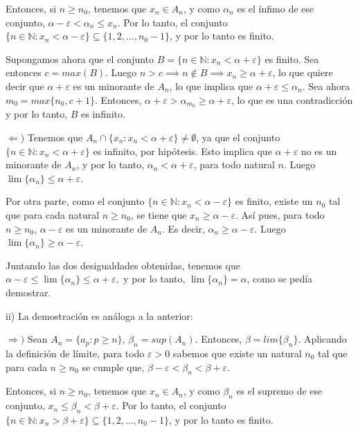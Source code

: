 \documentclass[10pt,a4paper]{article}
\begin{document}
	Entonces, si $n \geq n_0$, tenemos que $x_n \in A_n$, y como $\alpha_n$ es el ínfimo de ese conjunto, $ \alpha - \varepsilon < \alpha_n \leq x_n$. Por lo tanto, el conjunto $\{n \in \mathbb{N}: x_n < \alpha - \varepsilon\} \subseteq \{1, 2, \ldots, n_0 - 1\}$, y por lo tanto es finito. 
	
	
	Supongamos ahora que el conjunto $B = \{n \in \mathbb{N}: x_n < \alpha + \varepsilon\}$ es finito. Sea entonces $c = max(B)$. Luego $n > c \implies n \notin B \implies x_n \geq \alpha + \varepsilon$, lo que quiere decir que $\alpha + \varepsilon$ es un minorante de $A_n$, lo que implica que $\alpha + \varepsilon \leq \alpha_n$. Sea ahora $m_0 = max\{n_0, c + 1\}$. Entonces, $\alpha + \varepsilon > \alpha_{m_0} \geq \alpha + \varepsilon$, lo que es una contradicción y por lo tanto, $B$ es infinito.
	
	$\Leftarrow )$ Tenemos que $A_n \cap \{x_n : x_n < \alpha + \varepsilon\} \neq \emptyset$, ya que el conjunto $\{n \in \mathbb{N}: x_n < \alpha + \varepsilon\}$ es infinito, por hipótesis. Esto implica que $\alpha + \varepsilon$ no es un minorante de $A_n$, y por lo tanto, $\alpha_n < \alpha + \varepsilon$, para todo natural $n$. Luego $\lim\{\alpha_n\} \leq \alpha + \varepsilon$.
	
	Por otra parte, como el conjunto $\{n \in \mathbb{N}: x_n < \alpha - \varepsilon\}$ es finito, existe un $n_0$ tal que para cada natural $n \geq n_0$, se tiene que $x_n \geq \alpha - \varepsilon$. Así pues, para todo $n \geq n_0$, $\alpha - \varepsilon$ es un minorante de $A_n$. Es decir, $\alpha_n \geq \alpha - \varepsilon$. Luego $\lim\{\alpha_n\} \geq \alpha - \varepsilon$.
	
	Juntando las dos desigualdades obtenidas, tenemos que $ \alpha - \varepsilon \leq \lim\{\alpha_n\} \leq \alpha + \varepsilon,$ y por lo tanto, $\lim\{\alpha_n\} = \alpha$, como se pedía demostrar. 
	

	ii) La demostración es análoga a la anterior:
	
	$\Rightarrow )$ Sean $A_n = \{ a_p : p \geq n\}$, $\beta_n = sup(A_n)$. Entonces, $\beta = lim\{\beta_n\}$. Aplicando la definición de límite, para todo $\varepsilon > 0$ sabemos que existe un natural $n_0$ tal que para cada $n \geq n_0$ se cumple que, $\beta - \varepsilon < \beta_n < \beta + \varepsilon$. 
	
	Entonces, si $n \geq n_0$, tenemos que $x_n \in A_n$, y como $\beta_n$ es el supremo de ese conjunto, $x_n \leq \beta_n < \beta + \varepsilon$. Por lo tanto, el conjunto $\{n \in \mathbb{N}: x_n > \beta + \varepsilon\} \subseteq \{1, 2, \ldots, n_0 - 1\}$, y por lo tanto es finito. 
	
\end{document}
